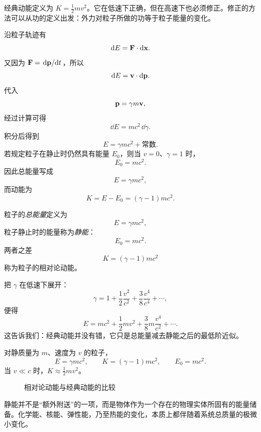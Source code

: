 经典动能定义为 $K=\tfrac12 mv^2$。它在低速下正确，但在高速下也必须修正。修正的方法可以从功的定义出发：外力对粒子所做的功等于粒子能量的变化。

沿粒子轨迹有
\[
\dd E = \vb{F}\cdot \dd \vb{x}.
\]
又因为 $\vb{F}=\dv*{\vb{p}}{t}$，所以
\[
\dd E = \vb{v}\cdot \dd \vb{p}.
\]
代入
\[
\vb{p}=\gamma m\vb{v},
\]
经过计算可得
\[
\dd E = mc^2\,\dd \gamma.
\]
积分后得到
\[
E=\gamma mc^2 + \text{常数}.
\]
若规定粒子在静止时仍然具有能量 $E_0$，则当 $v=0$、$\gamma=1$ 时，
\[
E_0 = mc^2.
\]
因此总能量写成
\[
E=\gamma mc^2,
\]
而动能为
\[
K=E-E_0=(\gamma-1)mc^2.
\]

\begin{definition}[总能量与静能]
粒子的\emph{总能量}定义为
\[
E=\gamma mc^2,
\]
粒子静止时的能量称为\emph{静能}：
\[
E_0=mc^2.
\]
两者之差
\[
K=(\gamma-1)mc^2
\]
称为粒子的相对论动能。
\end{definition}

把 $\gamma$ 在低速下展开：
\[
\gamma = 1 + \frac12\frac{v^2}{c^2}+\frac{3}{8}\frac{v^4}{c^4}+\cdots,
\]
便得
\[
E = mc^2 + \frac12 mv^2 + \frac38 m\frac{v^4}{c^2}+\cdots.
\]
这告诉我们：经典动能并没有错，它只是总能量减去静能之后的最低阶近似。

\begin{law}[相对论能量表达式]
对静质量为 $m$、速度为 $v$ 的粒子，
\[
E=\gamma mc^2,
\qquad
K=(\gamma-1)mc^2,
\qquad
E_0=mc^2.
\]
当 $v\ll c$ 时，$K\approx \tfrac12 mv^2$。
\end{law}

\begin{figure}[htbp]
\centering
{}
\caption{相对论动能与经典动能的比较}
\end{figure}

\begin{remark}
静能并不是“额外附送”的一项，而是物体作为一个存在的物理实体所固有的能量储备。化学能、核能、弹性能，乃至热能的变化，本质上都伴随着系统总质量的极微小变化。
\end{remark}

